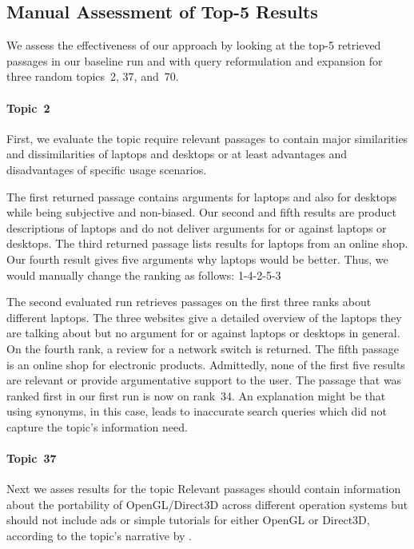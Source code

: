 \subsection{Manual Assessment of Top-5 Results}

We assess the effectiveness of our approach by looking at the top-5 retrieved passages in our baseline run and with query reformulation and expansion for three random topics~2, 37, and~70.

\paragraph{Topic~2}

First, we evaluate the topic 
\citet{BondarenkoFKSGBPBSWPH2022} require relevant passages to contain major similarities and dissimilarities of laptops and desktops or at least advantages and disadvantages of specific usage scenarios.

The first returned passage contains arguments for laptops and also for desktops while being subjective and non-biased.
Our second and fifth results are product descriptions of laptops and do not deliver arguments for or against laptops or desktops.
The third returned passage lists results for laptops from an online shop.
Our fourth result gives five arguments why laptops would be better.
Thus, we would manually change the ranking as follows: 1-4-2-5-3

The second evaluated run retrieves passages on the first three ranks about different laptops.
The three websites give a detailed overview of the laptops they are talking about but no argument for or against laptops or desktops in general.
On the fourth rank, a review for a network switch is returned.
The fifth passage is an online shop for electronic products.
Admittedly, none of the first five results are relevant or provide argumentative support to the user.
The passage that was ranked first in our first run is now on rank~34.
An explanation might be that using synonyms, in this case, leads to inaccurate search queries which did not capture the topic's information need.

\paragraph{Topic~37}

Next we asses results for the topic
Relevant passages should contain information about the portability of OpenGL/Direct3D across different operation systems but should not include ads or simple tutorials for either OpenGL or Direct3D, according to the topic's narrative by \citet{BondarenkoFKSGBPBSWPH2022}.

